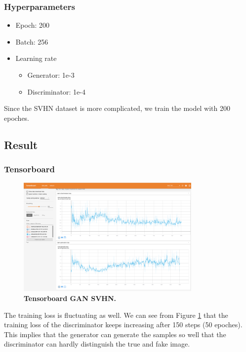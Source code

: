 \documentclass{article}
\newcommand{\mycaption}[2]{\caption[#1]{\textbf{#1.} #2}}
\begin{document}
\subsubsection{Hyperparameters}

\begin{itemize}
  \item Epoch: 200
  \item Batch: 256
  \item Learning rate
    \begin{itemize}
      \item Generator: 1e-3
      \item Discriminator: 1e-4
    \end{itemize}
\end{itemize}

Since the SVHN dataset is more complicated, we train the model with 200 epoches.

\newpage
\subsection{Result}

\subsubsection{Tensorboard}

\begin{figure}[!htb]
  \centering
  \includegraphics[width=0.8\textwidth]{imgs/tensorboard-GAN-SVHN.png}
  \mycaption{Tensorboard GAN SVHN}{}
  \label{fig_TB_GAN_SVHN}
\end{figure}

The training loss is fluctuating as well. We can see from Figure \ref{fig_TB_GAN_SVHN} that the training loss of the discriminator keeps increasing after 150 steps (50 epoches). This implies that the generator can generate the samples so well that the discriminator can hardly distinguish the true and fake image.
\end{document}
